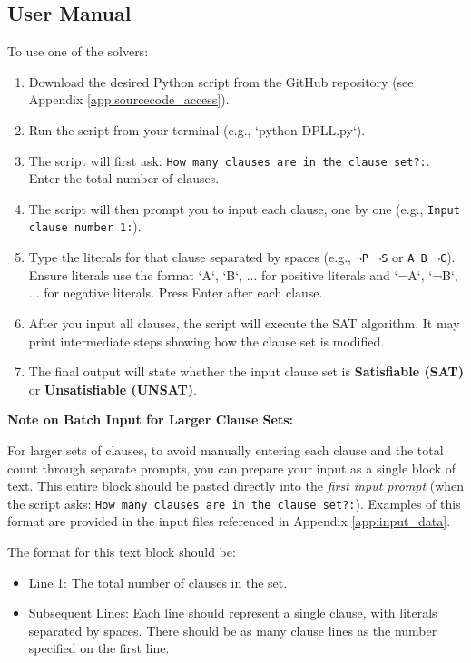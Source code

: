 \documentclass[11pt, a4paper]{article}
\begin{document}
\subsection*{User Manual}
To use one of the solvers:
\begin{enumerate}
    \item Download the desired Python script from the GitHub repository (see Appendix \ref{app:sourcecode_access}).
    \item Run the script from your terminal (e.g., `python DPLL.py`).
    \item The script will first ask: \texttt{How many clauses are in the clause set?:}. Enter the total number of clauses.
    \item The script will then prompt you to input each clause, one by one (e.g., \texttt{Input clause number 1:}).
    \item Type the literals for that clause separated by spaces (e.g., \texttt{¬P ¬S} or \texttt{A B ¬C}). Ensure literals use the format `A`, `B`, ... for positive literals and `¬A`, `¬B`, ... for negative literals. Press Enter after each clause.
    \item After you input all clauses, the script will execute the SAT algorithm. It may print intermediate steps showing how the clause set is modified.
    \item The final output will state whether the input clause set is \textbf{Satisfiable (SAT)} or \textbf{Unsatisfiable (UNSAT)}.
\end{enumerate}

\textbf{Note on Batch Input for Larger Clause Sets:}

For larger sets of clauses, to avoid manually entering each clause and the total count through separate prompts, you can prepare your input as a single block of text. This entire block should be pasted directly into the \textit{first input prompt} (when the script asks: \texttt{How many clauses are in the clause set?:}). Examples of this format are provided in the input files referenced in Appendix \ref{app:input_data}.

The format for this text block should be:
\begin{itemize}
    \item Line 1: The total number of clauses in the set.
    \item Subsequent Lines: Each line should represent a single clause, with literals separated by spaces. There should be as many clause lines as the number specified on the first line.
\end{itemize}
\end{document}
